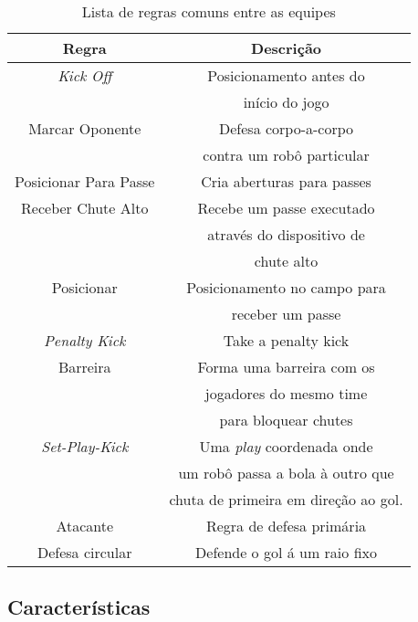 \begin{table}
  \begin{center}
    \begin{tabular}{|c|c|}
      \hline
      Regra                  & Descrição \\
      \hline
      \textit{Kick Off}      & Posicionamento antes do\\
                             & início do jogo\\
      \hline
      Marcar Oponente        & Defesa corpo-a-corpo\\
                             & contra um robô particular\\
      \hline
      Posicionar Para Passe  & Cria aberturas para passes\\
      \hline
      Receber Chute Alto     & Recebe um passe executado\\
                             & através do dispositivo de\\
      & chute alto\\
      \hline
      Posicionar             & Posicionamento no campo para\\
                             & receber um passe\\
      \hline
      \textit{Penalty Kick}  & Take a penalty kick\\
      \hline
      Barreira               & Forma uma barreira com os \\
                             & jogadores do mesmo time \\
                             & para bloquear chutes\\
      \hline
      \textit{Set-Play-Kick} & Uma \textit{play} coordenada onde\\
                             & um robô passa a bola à outro que \\
                             & chuta de primeira em direção ao gol.\\
      \hline
      Atacante               & Regra de defesa primária\\
      \hline
      Defesa circular        & Defende o gol á um raio fixo\\
      \hline
    \end{tabular}
  \caption{Lista de regras comuns entre as equipes}
  \label{regras}
  \end{center}
\end{table}


\subsection{Características}

